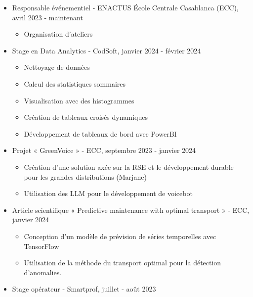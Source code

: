 \documentclass[11pt]{article}
\begin{document}
\begin{multicols*}{2}
\begin{itemize}[noitemsep, topsep=0pt, partopsep=0pt, parsep=0pt]
    \item Responsable événementiel - ENACTUS École Centrale Casablanca (ECC), avril 2023 - maintenant
        \begin{itemize}[noitemsep, topsep=0pt, partopsep=0pt, parsep=0pt]
            \item Organisation d'ateliers
        \end{itemize}
    \item Stage en Data Analytics - CodSoft, janvier 2024 - février 2024
        \begin{itemize}[noitemsep, topsep=0pt, partopsep=0pt, parsep=0pt]
            \item Nettoyage de données
            \item Calcul des statistiques sommaires
            \item Visualisation avec des histogrammes
            \item Création de tableaux croisés dynamiques
            \item Développement de tableaux de bord avec PowerBI
        \end{itemize}
    \item Projet « GreenVoice » - ECC, septembre 2023 - janvier 2024
        \begin{itemize}[noitemsep, topsep=0pt, partopsep=0pt, parsep=0pt]
            \item Création d'une solution axée sur la RSE et le développement durable pour les grandes distributions (Marjane)
            \item Utilisation des LLM pour le développement de voicebot
        \end{itemize}
    \item Article scientifique « Predictive maintenance with optimal transport » - ECC, janvier 2024
        \begin{itemize}[noitemsep, topsep=0pt, partopsep=0pt, parsep=0pt]
            \item Conception d'un modèle de prévision de séries temporelles avec TensorFlow
            \item Utilisation de la méthode du transport optimal pour la détection d'anomalies.
        \end{itemize}
    \item Stage opérateur - Smartprof, juillet - août 2023
        \begin{itemize}[noitemsep, topsep=0pt, partopsep=0pt, parsep=0pt]

\end{itemize}
\end{itemize}
\end{multicols*}
\end{document}
